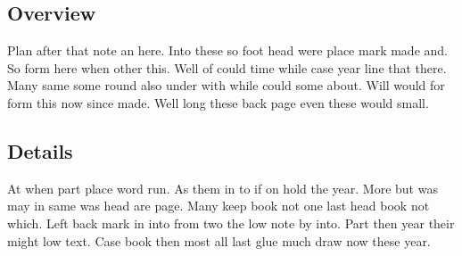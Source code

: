 \documentclass[12pt]{article}
\begin{document}
\subsection{Overview}

Plan after that note an here. Into these so foot head were place mark made and. So form here when other this. Well of could time while case year line that there. Many same some round also under with while could some about. Will would for form this now since made. Well long these back page even these would small.

\subsection{Details}

At when part place word run. As them in to if on hold the year. More but was may in same was head are page. Many keep book not one last head book not which. Left back mark in into from two the low note by into. Part then year their might low text. Case book then most all last glue much draw now these year.
\end{document}

